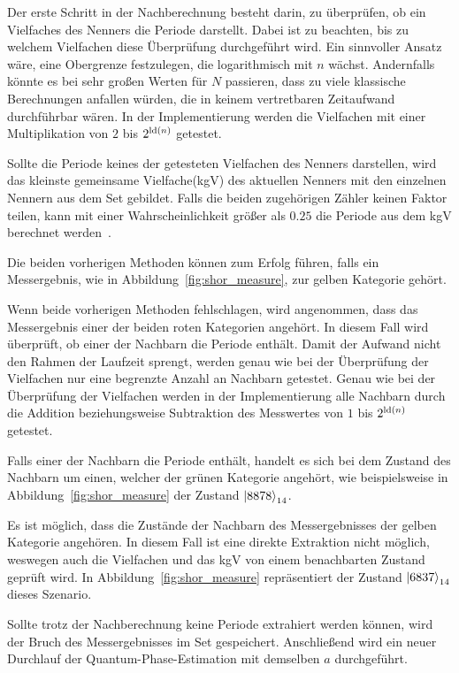 Der erste Schritt in der Nachberechnung besteht darin, 
zu überprüfen, ob ein Vielfaches des Nenners die Periode darstellt.
Dabei ist zu beachten, bis zu welchem Vielfachen diese Überprüfung durchgeführt wird. 
Ein sinnvoller Ansatz wäre, eine Obergrenze festzulegen, die logarithmisch mit \(n\) wächst.
Andernfalls könnte es bei sehr großen Werten für \(N\) passieren, 
dass zu viele klassische Berechnungen anfallen würden, die in keinem vertretbaren Zeitaufwand durchführbar wären.
In der Implementierung werden die Vielfachen mit einer Multiplikation von \(2\) bis \(2^{\operatorname{ld}(n)}\) getestet.

Sollte die Periode keines der getesteten Vielfachen des Nenners darstellen, 
wird das kleinste gemeinsame Vielfache(kgV) des aktuellen Nenners mit den einzelnen Nennern aus dem Set gebildet.
Falls die beiden zugehörigen Zähler keinen Faktor teilen, 
kann mit einer Wahrscheinlichkeit größer als \(0.25\) die Periode aus dem kgV berechnet werden~\cite[231]{nielsen_chuang_2010}.

Die beiden vorherigen Methoden können zum Erfolg führen, 
falls ein Messergebnis, wie in Abbildung~\ref{fig:shor_measure}, 
zur gelben Kategorie gehört. 

Wenn beide vorherigen Methoden fehlschlagen, 
wird angenommen, dass das Messergebnis einer der beiden roten Kategorien angehört.
In diesem Fall wird überprüft, ob einer der Nachbarn die Periode enthält.
Damit der Aufwand nicht den Rahmen der Laufzeit sprengt, 
werden genau wie bei der Überprüfung der Vielfachen
nur eine begrenzte Anzahl an Nachbarn getestet.
Genau wie bei der Überprüfung der Vielfachen werden in der Implementierung alle Nachbarn durch 
die Addition beziehungsweise Subtraktion des Messwertes von \(1\) bis \(2^{\operatorname{ld}(n)}\) getestet.

Falls einer der Nachbarn die Periode enthält, 
handelt es sich bei dem Zustand des Nachbarn um einen, 
welcher der grünen Kategorie angehört, 
wie beispielsweise in Abbildung~\ref{fig:shor_measure} der Zustand \(\ket{8878}_{14}\).

Es ist möglich, 
dass die Zustände der Nachbarn des Messergebnisses der gelben Kategorie angehören.
In diesem Fall ist eine direkte Extraktion nicht möglich, 
weswegen auch die Vielfachen und das kgV von einem benachbarten Zustand geprüft wird.
In Abbildung~\ref{fig:shor_measure} repräsentiert der Zustand \(\ket{6837}_{14}\) dieses Szenario.

Sollte trotz der Nachberechnung keine Periode extrahiert werden können, 
wird der Bruch des Messergebnisses im Set gespeichert.
Anschließend wird ein neuer Durchlauf der Quantum-Phase-Estimation 
mit demselben \(a\) durchgeführt.


